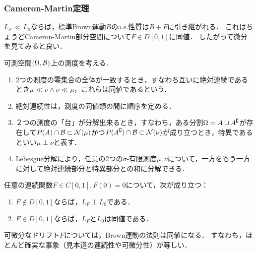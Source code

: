 \documentclass[uplatex,dvipdfmx]{jsreport}
\begin{document}
\subsubsection{Cameron-Martin定理}

\begin{tcolorbox}[colframe=ForestGreen, colback=ForestGreen!10!white,breakable,colbacktitle=ForestGreen!40!white,coltitle=black,fonttitle=\bfseries\sffamily,
title=]
    $L_F\ll L_0$ならば，標準Brown運動$B$のa.s.性質は$B+F$に引き継がれる．
    これはちょうどCameron-Martin部分空間について$F\in D[0,1]$に同値．
    したがって微分を見てみると良い．
\end{tcolorbox}

\begin{definition}
    可測空間$(\Omega,\mathcal{B})$上の測度を考える．
    \begin{enumerate}
        \item 2つの測度の零集合の全体が一致するとき，すなわち互いに絶対連続であるとき$\mu\ll\nu\land\nu\ll\mu$，これらは同値であるという．
        \item 絶対連続性は，測度の同値類の間に順序を定める．
        \item ２つの測度の「台」が分解出来るとき，すなわち，ある分割$\Omega=A\sqcup A^\complement$が存在して$P(A)\cap\mathcal{B}\subset\mathcal{N}(\mu)$かつ$P(A^\complement)\cap\mathcal{B}\subset\mathcal{N}(\nu)$が成り立つとき，特異であるといい$\mu\perp\nu$と表す．
        \item Lebesgue分解により，任意の2つの$\sigma$-有限測度$\mu,\nu$について，一方をもう一方に対して絶対連続部分と特異部分との和に分解できる．
    \end{enumerate}
\end{definition}

\begin{theorem}
    任意の連続関数$F\in C[0,1],F(0)=0$について，次が成り立つ：
    \begin{enumerate}
        \item $F\notin D[0,1]$ならば，$L_F\perp L_0$である．
        \item $F\in D[0,1]$ならば，$L_F$と$L_0$は同値である．
    \end{enumerate}
\end{theorem}
\begin{remarks}
    可微分なドリフト$F$については，Brown運動の法則は同値になる．
    すなわち，ほとんど確実な事象（見本道の連続性や可微分性）が等しい．
\end{remarks}
\end{document}
